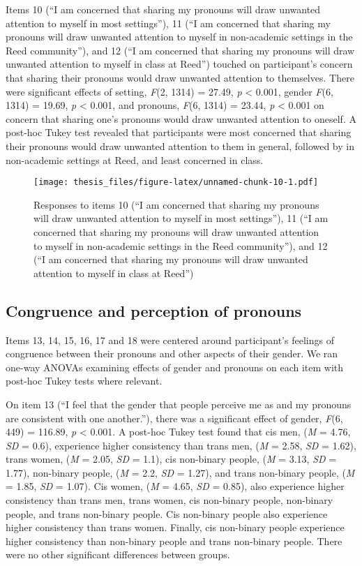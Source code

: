 \documentclass[12pt,twoside]{reedthesis}
\begin{document}
Items 10 (``I am concerned that sharing my pronouns will draw unwanted attention to myself in most settings''), 11 (``I am concerned that sharing my pronouns will draw unwanted attention to myself in non-academic settings in the Reed community''), and 12 (``I am concerned that sharing my pronouns will draw unwanted attention to myself in class at Reed'') touched on participant's concern that sharing their pronouns would draw unwanted attention to themselves. There were significant effects of setting, \emph{F}(2, 1314) = 27.49, \emph{p} \textless{} 0.001, gender \emph{F}(6, 1314) = 19.69, \emph{p} \textless{} 0.001, and pronouns, \emph{F}(6, 1314) = 23.44, \emph{p} \textless{} 0.001 on concern that sharing one's pronouns would draw unwanted attention to oneself. A post-hoc Tukey test revealed that participants were most concerned that sharing their pronouns would draw unwanted attention to them in general, followed by in non-academic settings at Reed, and least concerned in class.
\begin{figure}
\centering
\texttt{[image: thesis\_files/figure-latex/unnamed-chunk-10-1.pdf]}
\caption{\label{fig:unnamed-chunk-10}Responses to items 10 (``I am concerned that sharing my pronouns will draw unwanted attention to myself in most settings''), 11 (``I am concerned that sharing my pronouns will draw unwanted attention to myself in non-academic settings in the Reed community''), and 12 (``I am concerned that sharing my pronouns will draw unwanted attention to myself in class at Reed'')}
\end{figure}
\hypertarget{congruence-and-perception-of-pronouns}{%
\subsection{Congruence and perception of pronouns}\label{congruence-and-perception-of-pronouns}}

Items 13, 14, 15, 16, 17 and 18 were centered around participant's feelings of congruence between their pronouns and other aspects of their gender. We ran one-way ANOVAs examining effects of gender and pronouns on each item with post-hoc Tukey tests where relevant.

On item 13 (``I feel that the gender that people perceive me as and my pronouns are consistent with one another.''), there was a significant effect of gender, \emph{F}(6, 449) = 116.89, \emph{p} \textless{} 0.001. A post-hoc Tukey test found that cis men, (\emph{M} = 4.76, \emph{SD} = 0.6), experience higher consistency than trans men, (\emph{M} = 2.58, \emph{SD} = 1.62), trans women, (\emph{M} = 2.05, \emph{SD} = 1.1), cis non-binary people, (\emph{M} = 3.13, \emph{SD} = 1.77), non-binary people, (\emph{M} = 2.2, \emph{SD} = 1.27), and trans non-binary people, (\emph{M} = 1.85, \emph{SD} = 1.07). Cis women, (\emph{M} = 4.65, \emph{SD} = 0.85), also experience higher consistency than trans men, trans women, cis non-binary people, non-binary people, and trans non-binary people. Cis non-binary people also experience higher consistency than trans women. Finally, cis non-binary people experience higher consistency than non-binary people and trans non-binary people. There were no other significant differences between groups.
\end{document}
